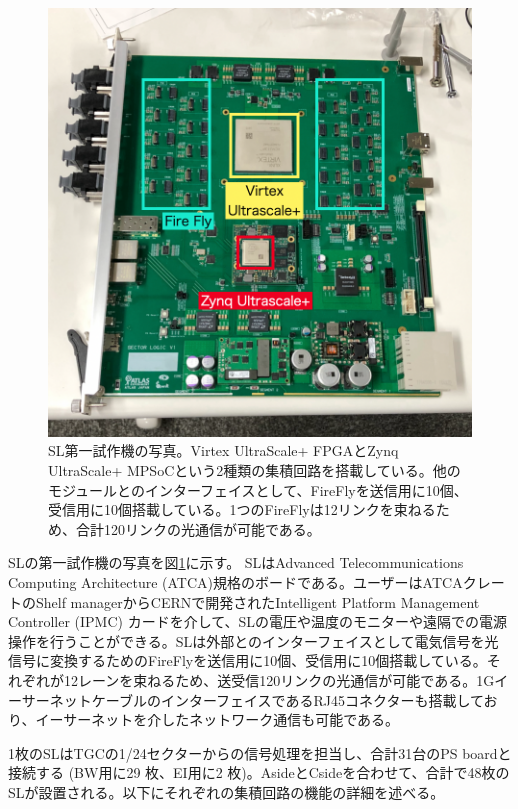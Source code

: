 \begin{figure} 
    \centering
    \includegraphics[width=14cm]{fig/Intro/TGC_SL.jpg}
    \caption[SL第一試作機の写真]{SL第一試作機の写真。Virtex UltraScale+ FPGAとZynq UltraScale+ MPSoCという2種類の集積回路を搭載している。他のモジュールとのインターフェイスとして、FireFlyを送信用に10個、受信用に10個搭載している。1つのFireFlyは12リンクを束ねるため、合計120リンクの光通信が可能である。}
    \label{TGC_SL}
\end{figure}

SLの第一試作機の写真を図\ref{TGC_SL}に示す。
SLはAdvanced Telecommunications Computing Architecture (ATCA)規格のボードである。ユーザーはATCAクレートのShelf managerからCERNで開発されたIntelligent Platform Management Controller  (IPMC) カードを介して、SLの電圧や温度のモニターや遠隔での電源操作を行うことができる。SLは外部とのインターフェイスとして電気信号を光信号に変換するためのFireFlyを送信用に10個、受信用に10個搭載している。それぞれが12レーンを束ねるため、送受信120リンクの光通信が可能である。1GイーサーネットケーブルのインターフェイスであるRJ45コネクターも搭載しており、イーサーネットを介したネットワーク通信も可能である。

1枚のSLはTGCの1/24セクターからの信号処理を担当し、合計31台のPS boardと接続する (BW用に29 枚、EI用に2 枚)。AsideとCsideを合わせて、合計で48枚のSLが設置される。以下にそれぞれの集積回路の機能の詳細を述べる。

